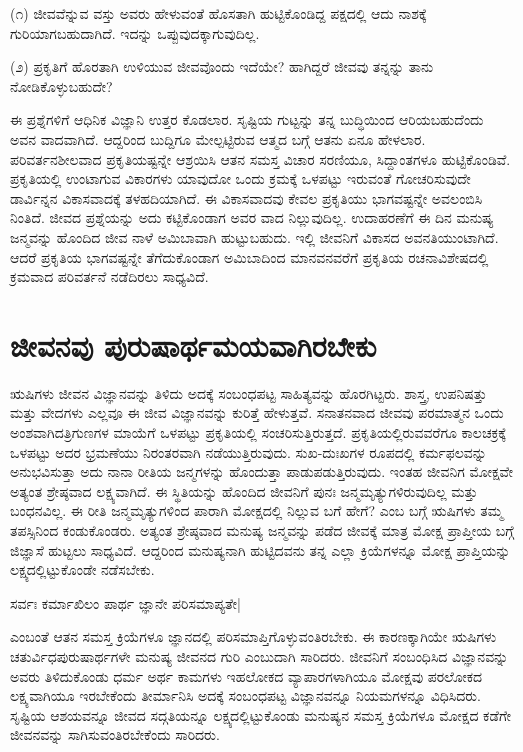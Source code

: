 (೧) ಜೀವವೆನ್ನುವ ವಸ್ತು ಅವರು ಹೇಳುವಂತೆ ಹೊಸತಾಗಿ ಹುಟ್ಟಿಕೊಂಡಿದ್ದ ಪಕ್ಷದಲ್ಲಿ ಆದು ನಾಶಕ್ಕೆ ಗುರಿಯಾಗಬಹುದಾಗಿದೆ. ಇದನ್ನು ಒಪ್ಪುವುದಕ್ಕಾಗುವುದಿಲ್ಲ. 

(೨) ಪ್ರಕೃತಿಗೆ ಹೊರತಾಗಿ ಉಳಿಯುವ ಜೀವವೊಂದು ಇದೆಯೇ? ಹಾಗಿದ್ದರೆ ಜೀವವು ತನ್ನನ್ನು ತಾನು ನೋಡಿಕೊಳ್ಳುಬಹುದೇ? 

ಈ ಪ್ರಶ್ನೆಗಳಿಗೆ ಆಧಿನಿಕ ವಿಜ್ಞಾನಿ ಉತ್ತರ ಕೊಡಲಾರ. ಸೃಷ್ಟಿಯ ಗುಟ್ಟನ್ನು ತನ್ನ ಬುದ್ಧಿಯಿಂದ ಆರಿಯಬಹುದೆಂದು ಅವನ ವಾದವಾಗಿದೆ. ಆದ್ದರಿಂದ ಬುದ್ದಿಗೂ ಮೇಲ್ಪಟ್ಟಿರುವ ಆತ್ಮದ ಬಗ್ಗೆ ಆತನು ಏನೂ ಹೇಳಲಾರ. ಪರಿವರ್ತನಶೀಲವಾದ ಪ್ರಕೃತಿಯಷ್ಟನ್ನೇ ಆಶ್ರಯಿಸಿ ಆತನ ಸಮಸ್ತ ವಿಚಾರ ಸರಣಿಯೂ, ಸಿದ್ದಾಂತಗಳೂ ಹುಟ್ಟಿಕೊಂಡಿವೆ. ಪ್ರಕೃತಿಯಲ್ಲಿ ಉಂಟಾಗುವ ವಿಕಾರಗಳು ಯಾವುದೋ ಒಂದು ಕ್ರಮಕ್ಕೆ ಒಳಪಟ್ಟು ಇರುವಂತೆ ಗೋಚರಿಸುವುದೇ ಡಾರ್ವಿನ್ನನ ವಿಕಾಸವಾದಕ್ಕೆ ತಳಹದಿಯಾಗಿದೆ. ಈ ವಿಕಾಸವಾದವು ಕೇವಲ ಪ್ರಕೃತಿಯು ಭಾಗವಷ್ಟನ್ನೇ ಅವಲಂಬಿಸಿ ನಿಂತಿದೆ. ಜೀವದ ಪ್ರಶ್ನೆಯನ್ನು ಅದು ಕಟ್ಟಿಕೊಂಡಾಗ ಅವರ ವಾದ ನಿಲ್ಲುವುದಿಲ್ಲ. ಉದಾಹರಣೆಗೆ ಈ ದಿನ ಮನುಷ್ಯ ಜನ್ಮವನ್ನು ಹೊಂದಿದ ಜೀವ ನಾಳೆ ಅಮಿಬಾವಾಗಿ ಹುಟ್ಟುಬಹುದು. ಇಲ್ಲಿ ಜೀವನಿಗೆ ವಿಕಾಸದ ಅವನತಿಯುಂಟಾಗಿದೆ. ಆದರೆ ಪ್ರಕೃತಿಯ ಭಾಗವಷ್ಟನ್ನೇ ತೆಗೆದುಕೊಂಡಾಗ ಅಮಿಬಾದಿಂದ ಮಾನವನವರೆಗೆ ಪ್ರಕೃತಿಯ ರಚನಾವಿಶೇಷದಲ್ಲಿ ಕ್ರಮವಾದ ಪರಿವರ್ತನೆ ನಡೆದಿರಲು ಸಾಧ್ಯವಿದೆ.

\section*{ಜೀವನವು ಪುರುಷಾರ್ಥಮಯವಾಗಿರಬೇಕು}

ಋಷಿಗಳು ಜೀವನ ವಿಜ್ಞಾನವನ್ನು ತಿಳಿದು ಅದಕ್ಕೆ ಸಂಬಂಧಪಟ್ಟ ಸಾಹಿತ್ಯವನ್ನು ಹೊರಗಿಟ್ಟರು. ಶಾಸ್ತ್ರ, ಉಪನಿಷತ್ತು ಮತ್ತು ವೇದಗಳು ಎಲ್ಲವೂ ಈ ಜೀವ ವಿಜ್ಞಾನವನ್ನು ಕುರಿತ್ತೆ ಹೇಳುತ್ತವೆ. ಸನಾತನವಾದ ಜೀವವು ಪರಮಾತ್ಮನ ಒಂದು ಅಂಶವಾಗಿದತ್ರಿಗುಣಗಳ ಮಾಯೆಗೆ ಒಳಪಟ್ಟು ಪ್ರಕೃತಿಯಲ್ಲಿ ಸಂಚರಿಸುತ್ತಿರುತ್ತದೆ. ಪ್ರಕೃತಿಯಲ್ಲಿರುವವರೆಗೂ ಕಾಲಚಕ್ರಕ್ಕೆ ಒಳಪಟ್ಟು ಅದರ ಭ್ರಮಣೆಯು ನಿರಂತರವಾಗಿ ನಡೆಯುತ್ತಿರುವುದು. ಸುಖ-ದುಃಖಗಳ ರೂಪದಲ್ಲಿ ಕರ್ಮಫಲವನ್ನು ಅನುಭವಿಸುತ್ತಾ ಅದು ನಾನಾ ರೀತಿಯ ಜನ್ಮಗಳನ್ನು ಹೊಂದುತ್ತಾ ಪಾಡುಪಡುತ್ತಿರುವುದು. ಇಂತಹ ಜೀವನಿಗ ಮೋಕ್ಷವೇ ಅತ್ಯಂತ ಶ್ರೇಷ್ಠವಾದ ಲಕ್ಷ್ಯವಾಗಿದೆ. ಈ ಸ್ಥಿತಿಯನ್ನು ಹೊಂದಿದ ಜೀವನಿಗೆ ಪುನಃ ಜನ್ಮಮೃತ್ಯುಗಳಿರುವುದಿಲ್ಲ ಮತ್ತು ಬಂಧನವಿಲ್ಲ. ಈ ರೀತಿ ಜನ್ಮಮೃತ್ಯುಗಳಿಂದ ಪಾರಾಗಿ ಮೋಕ್ಷದಲ್ಲಿ ನಿಲ್ಲುವ ಬಗೆ ಹೇಗೆ? ಎಂಬ ಬಗ್ಗೆ ಋಷಿಗಳು ತಮ್ಮ ತಪಸ್ಸಿನಿಂದ ಕಂಡುಕೊಂಡರು. ಅತ್ಯಂತ ಶ್ರೇಷ್ಠವಾದ ಮನುಷ್ಯ ಜನ್ಮವನ್ನು ಪಡೆದ ಜೀವಕ್ಕೆ ಮಾತ್ರ ಮೋಕ್ಷ ಪ್ರಾಪ್ತೀಯ ಬಗ್ಗೆ ಜಿಜ್ಞಾಸೆ ಹುಟ್ಟಲು ಸಾಧ್ಯವಿದೆ. ಆದ್ದರಿಂದ ಮನುಷ್ಯನಾಗಿ ಹುಟ್ಟಿದವನು ತನ್ನ ಎಲ್ಲಾ‌ ಕ್ರಿಯೆಗಳನ್ನೂ ಮೋಕ್ಷ ಪ್ರಾಪ್ತಿಯನ್ನು ಲಕ್ಷ್ಯದಲ್ಲಿಟ್ಟುಕೊಂಡೇ ನಡೆಸಬೇಕು.

\begin{shloka}
ಸರ್ವಃ ಕರ್ಮಾಖಿಲಂ ಪಾರ್ಥ ಜ್ಞಾನೇ ಪರಿಸಮಾಪ್ಯತೇ|\label{78}
\end{shloka}

ಎಂಬಂತೆ ಆತನ ಸಮಸ್ತ ಕ್ರಿಯೆಗಳೂ ಜ್ಞಾನದಲ್ಲಿ ಪರಿಸಮಾಪ್ತಿಗೊಳ್ಳುವಂತಿರಬೇಕು. ಈ ಕಾರಣಕ್ಕಾಗಿಯೇ ಋಷಿಗಳು ಚತುರ್ವಿಧಪುರುಷಾರ್ಥಗಳೇ ಮನುಷ್ಯ ಜೀವನದ ಗುರಿ ಎಂಬುದಾಗಿ ಸಾರಿದರು. ಜೀವನಿಗೆ ಸಂಬಂಧಿಸಿದ ವಿಜ್ಞಾನವನ್ನು ಅವರು ತಿಳಿದುಕೊಂಡು ಧರ್ಮ ಅರ್ಥ ಕಾಮಗಳು ಇಹಲೋಕದ ವ್ಯಾಪಾರಗಳಾಗಿಯೂ ಮೋಕ್ಷವು ಪರಲೋಕದ ಲಕ್ಷ್ಯವಾಗಿಯೂ ಇರಬೇಕೆಂದು ತೀರ್ಮಾನಿಸಿ ಅದಕ್ಕೆ ಸಂಬಂಧಪಟ್ಟ ವಿಜ್ಞಾನವನ್ನೂ ನಿಯಮಗಳನ್ನೂ ವಿಧಿಸಿದರು. ಸೃಷ್ಟಿಯ ಆಶಯವನ್ನೂ ಜೀವದ ಸದ್ಗತಿಯನ್ನೂ ಲಕ್ಷ್ಯದಲ್ಲಿಟ್ಟುಕೊಂಡು ಮನುಷ್ಯನ ಸಮಸ್ತ ಕ್ರಿಯೆಗಳೂ ಮೋಕ್ಷದ ಕಡೆಗೇ ಜೀವನವನ್ನು ಸಾಗಿಸುವಂತಿರಬೇಕೆಂದು ಸಾರಿದರು.

